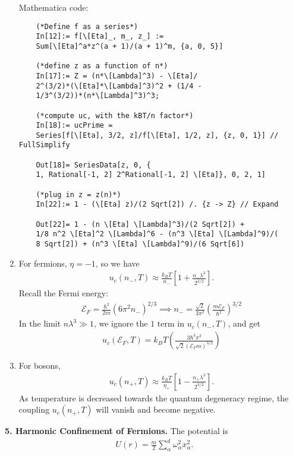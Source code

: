 \documentclass{article}
\theoremstyle{definition}
\newcommand{\al}{\alpha}
\newcommand{\f}[2]{\frac{#1}{#2}}
\newcommand{\lp}{\left(}
\newcommand{\rp}{\right)}
\newcommand{\lb}{\left[}
\newcommand{\rb}{\right]}
\begin{document}
\begin{enumerate}[label=(\alph*)]
	
	
	Mathematica code:
	\begin{lstlisting}
	(*Define f as a series*)
	In[12]:= f[\[Eta]_, m_, z_] := 
	Sum[\[Eta]^a*z^(a + 1)/(a + 1)^m, {a, 0, 5}]
	
	(*define z as a function of n*)
	In[17]:= Z = (n*\[Lambda]^3) - \[Eta]/
	2^(3/2)*(\[Eta]*\[Lambda]^3)^2 + (1/4 - 
	1/3^(3/2))*(n*\[Lambda]^3)^3;
	
	(*compute uc, with the kBT/n factor*)
	In[18]:= ucPrime = 
	Series[f[\[Eta], 3/2, z]/f[\[Eta], 1/2, z], {z, 0, 1}] // FullSimplify
	
	Out[18]= SeriesData[z, 0, {
	1, Rational[-1, 2] 2^Rational[-1, 2] \[Eta]}, 0, 2, 1]
	
	(*plug in z = z(n)*)
	In[22]:= 1 - (\[Eta] z)/(2 Sqrt[2]) /. {z -> Z} // Expand
	
	Out[22]= 1 - (n \[Eta] \[Lambda]^3)/(2 Sqrt[2]) + 
	1/8 n^2 \[Eta]^2 \[Lambda]^6 - (n^3 \[Eta] \[Lambda]^9)/(
	8 Sqrt[2]) + (n^3 \[Eta] \[Lambda]^9)/(6 Sqrt[6])
	\end{lstlisting}
	
	
	
	\item For fermions, $\eta = -1$, so we have
	\begin{align*}
	u_c(n_-,T) \approx \f{k_BT}{n_-}\lb   1  + \f{n_- \lambda^3}{2^{3/2}} \rb.
	\end{align*}
	Recall the Fermi energy:
	\begin{align*}
	\mathcal{E}_F = \f{\hbar^2}{2m} \lp 6\pi^2 n_- \rp^{2/3} \implies n_- = \f{\sqrt{2}}{3\pi^2} \lp \f{m \mathcal{E}_F}{\hbar^2} \rp^{3/2}
	\end{align*}
	In the limit $n\lambda^3 \gg 1$, we ignore the $1$ term in $u_c(n_-,T)$, and get
	\begin{align*}
	u_c(\mathcal{E}_F,T) = \boxed{k_BT \lp\f{3\hbar^3  \pi^2}{\sqrt{2} (\mathcal{E}_F m)^{3/2}}\rp}
	\end{align*}
	
	\item For bosons, 
	\begin{align*}
	u_c(n_+,T) \approx \f{k_BT}{\eta_+}\lb   1  - \f{n_+ \lambda^3}{2^{3/2}} \rb.
	\end{align*}
	As temperature is decreased towards the quantum degeneracy regime, the coupling $u_c(n_+,T)$ will vanish and become negative. 
\end{enumerate}




\noindent \textbf{5. Harmonic Confinement of Fermions.} The potential is 
\begin{align*}
U(r) = \f{m}{2}\sum_\al^d \omega_\al^2 x_\al^2.
\end{align*}
\end{document}
